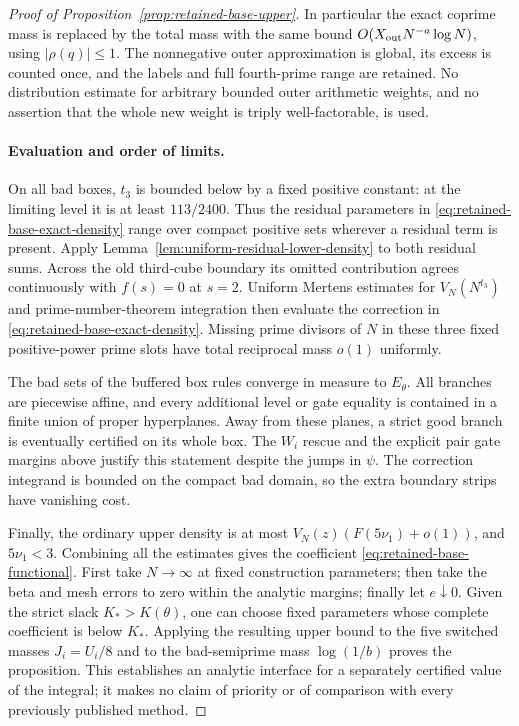 \begin{proof}[Proof of Proposition~\ref{prop:retained-base-upper}]
In particular the exact coprime mass is replaced by the total mass
with the same bound
$O(X_{\rm out}N^{-a}\log N)$, using $|\rho(q)|\le1$.
The nonnegative outer approximation is global, its excess is counted
once, and the labels and full fourth-prime range are retained.
No distribution estimate for arbitrary bounded outer arithmetic
weights, and no assertion that the whole new weight is triply
well-factorable, is used.

\paragraph{Evaluation and order of limits.}
On all bad boxes, $t_3$ is bounded below by a fixed positive constant:
at the limiting level it is at least $113/2400$. Thus the residual
parameters in \eqref{eq:retained-base-exact-density} range over
compact positive sets wherever a residual term is present. Apply
Lemma~\ref{lem:uniform-residual-lower-density} to both residual sums.
Across the old third-cube boundary its omitted contribution agrees
continuously with $f(s)=0$ at $s=2$.
Uniform Mertens estimates for $V_N(N^{t_3})$ and prime-number-theorem
integration then evaluate the correction in
\eqref{eq:retained-base-exact-density}. Missing prime divisors of
$N$ in these three fixed positive-power prime slots have total
reciprocal mass $o(1)$ uniformly.

The bad sets of the buffered box rules converge in measure to
$E_\theta$. All branches are piecewise affine, and every additional
level or gate equality is contained in a finite union of proper
hyperplanes. Away from these planes, a strict good branch is
eventually certified on its whole box. The $W_i$ rescue and the
explicit pair gate margins above justify this statement despite
the jumps in $\psi$. The correction integrand is bounded on the
compact bad domain, so the extra boundary strips have vanishing cost.

Finally, the ordinary upper density is at most
$V_N(z)(F(5\nu_1)+o(1))$, and $5\nu_1<3$.
Combining all the estimates gives the coefficient
\eqref{eq:retained-base-functional}. First take $N\to\infty$ at
fixed construction parameters; then take the beta and mesh errors
to zero within the analytic margins; finally let $e\downarrow0$.
Given the strict slack $K_*>K(\theta)$, one can choose fixed
parameters whose complete coefficient is below $K_*$.
Applying the resulting upper bound to the five switched masses
$J_i=U_i/8$ and to the bad-semiprime mass $\log(1/b)$ proves
the proposition. This establishes an analytic interface for a
separately certified value of the integral; it makes no claim of
priority or of comparison with every previously published method.
\end{proof}
